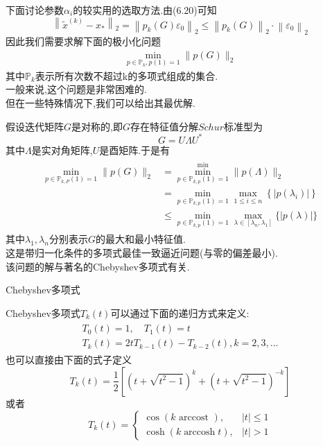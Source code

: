 \documentclass[notheorems,serif]{beamer}
\renewcommand{\normalsize}{\wuhao}
\newcommand{\wuhao}{\fontsize{10.5pt}{\baselineskip}\selectfont}
\begin{document}
\begin{frame}
下面讨论参数$\alpha_i$的较实用的选取方法.由(6.20)可知
$$\left\|\tilde{x}^{(k)}-x_{*}\right\|_{2}=\left\|p_{k}(G) \varepsilon_{0}\right\|_{2} \leq\left\|p_{k}(G)\right\|_{2} \cdot\left\|\varepsilon_{0}\right\|_{2}$$
因此我们需要求解下面的极小化问题
\begin{align*}
\min _{p \in \mathbb{P}_{k}, p(1)=1}\|p(G)\|_{2}
\tag{6.21}
\end{align*}
其中$\mathbb{P}_{k}$表示所有次数不超过k的多项式组成的集合.\\
一般来说,这个问题是非常困难的.\\
但在一些特殊情况下,我们可以给出其最优解.\\
\end{frame}

\begin{frame}
假设迭代矩阵$G$是对称的,即$G$存在特征值分解$Schur$标准型为
$$
G=U \Lambda U^{*}
$$
其中$\Lambda$是实对角矩阵,$U$是酉矩阵.于是有
\begin{align*}
\begin{array}{ll}
	\min _{p \in \mathbb{P}_{k, P}(1)=1}\|p(G)\|_{2}&{=\min _{p \in \mathbb{P}_{k, p}(1)=1}^{\min }\|p(\Lambda)\|_{2}} \\ {}&{=\min _{p \in \mathbb{P}_{k, p}(1)=1} \max _{1 \leq i \leq n}\left\{\left|p\left(\lambda_{i}\right)\right|\right\}} \\ {}&{ \leq \min _{p \in \mathbb{P}_{k, p}(1)=1} \max _{\lambda \in\left[\lambda_{n}, \lambda_{1}\right]}\{|p(\lambda)|\}}\end{array}
\tag{6.22}
\end{align*}
其中$\lambda_{1}, \lambda_{n}$分别表示$G$的最大和最小特征值.\\
这是带归一化条件的多项式最佳一致逼近问题(与零的偏差最小).\\
该问题的解与著名的{\color{blue}Chebyshev多项式}有关.\\
\end{frame}

\begin{frame}


{\color{blue}\Large Chebyshev多项式}

\quad

\normalsize
Chebyshev多项式$T_{k}(t)$可以通过下面的递归方式来定义:
\begin{align*}
\begin{array}{l}{T_{0}(t)=1, \quad T_{1}(t)=t} \\ {T_{k}(t)=2 t T_{k-1}(t)-T_{k-2}(t), k=2,3, \ldots}\end{array}
\tag{6.23}
\end{align*}
也可以直接由下面的式子定义
$$
T_{k}(t)=\frac{1}{2}\left[\left(t+\sqrt{t^{2}-1}\right)^{k}+\left(t+\sqrt{t^{2}-1}\right)^{-k}\right]
$$
或者
$$
T_{k}(t)=\left\{\begin{array}{ll}{\cos (k \text { arccost }),} & {|t| \leq 1} \\ {\cosh (k \operatorname{arccosh} t),} & {|t|>1}\end{array}\right.
$$
\end{frame}
\end{document}
